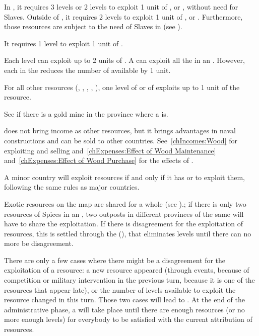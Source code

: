 \bparag In , it requires 3 \TP levels or 2 \COL levels to
exploit 1 unit of ,  or ,
without need for Slaves.
\bparag Outside of , it requires 2 \COL levels to exploit 1
unit of ,  or . Furthermore,
those resources are subject to the need of Slaves in  (see
).

\aparag[Fish.] It requires 1 \COL level to exploit 1 unit of .

\aparag[Fur.]
\bparag Each \TP level can exploit up to 2 units of .
\bparag A \COL can exploit all the  in an \Area. However, each
\COL\faceplus in the \Area reduces the number of available  by 1
unit.

 For all other resources (,
, , , ), one level of \COL or of
\TP exploits up to 1 unit of the resource.

\aparag[Gold.] See  if there is a gold mine in
the province where a \COL is.

\aparag[Wood.]  does not bring income as other resources, but
it brings advantages in naval constructions and can be sold to other
countries. See~\ref{chIncomes:Wood} for exploiting and selling
 and~\ref{chExpenses:Effect of Wood Maintenance}
and~\ref{chExpenses:Effect of Wood Purchase} for the effects of
.

\aparag A \ROTW minor country will exploit resources if and only if it has \TP
or \COL to exploit them, following the same rules as major countries.

\aparag Exotic resources on the \ROTW map are shared for a whole \Area (see
).; if there is only two resources of Spices in
an \Area, two outposts in different provinces of the same \Area will have to
share the exploitation.
\bparag If there is disagreement for the exploitation of resources, this is
settled through the 
(), that eliminates levels until there can no
more be disagreement.

 There are only a few cases where there might be a
disagreement for the exploitation of a resource: a new resource appeared
(through events, because of competition or military intervention in the
previous turn, because it is one of the resources that appear late), or the
number of levels available to exploit the resource changed in this turn.
\bparag Those two cases will lead to . At the end
of the administrative phase, a  will take place until there
are enough resources (or no more enough levels) for everybody to be satisfied
with the current attribution of resources.

